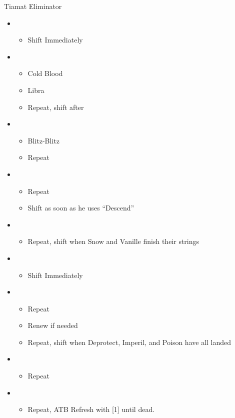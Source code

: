 	\begin{battle}[1:55]{Tiamat Eliminator}
		\begin{itemize}
			\item \second
			      \begin{itemize}
				      \item Shift Immediately
			      \end{itemize}
			\item \sixth
			      \begin{itemize}
				      \item Cold Blood
				      \item Libra
				      \item Repeat, shift after \stagger
			      \end{itemize}
			\item \second
			      \begin{itemize}
				      \item Blitz-Blitz
				      \item Repeat
			      \end{itemize}
			\item \fourth
			      \begin{itemize}
				      \item Repeat
				      \item Shift as soon as he uses ``Descend''
			      \end{itemize}
			\item \fifth
			      \begin{itemize}
				      \item Repeat, shift when Snow and Vanille finish their strings
			      \end{itemize}
			\item \sixth
			      \begin{itemize}
				      \item Shift Immediately
			      \end{itemize}
			\item \fifth
			      \begin{itemize}
				      \item Repeat
				      \item Renew if needed
				      \item Repeat, shift when Deprotect, Imperil, and Poison have all landed
			      \end{itemize}
			\item \sixth
			      \begin{itemize}
				      \item Repeat
			      \end{itemize}
			\item \second
			      \begin{itemize}
				      \item Repeat, ATB Refresh with [1] until dead.
			      \end{itemize}
		\end{itemize}
	\end{battle}

